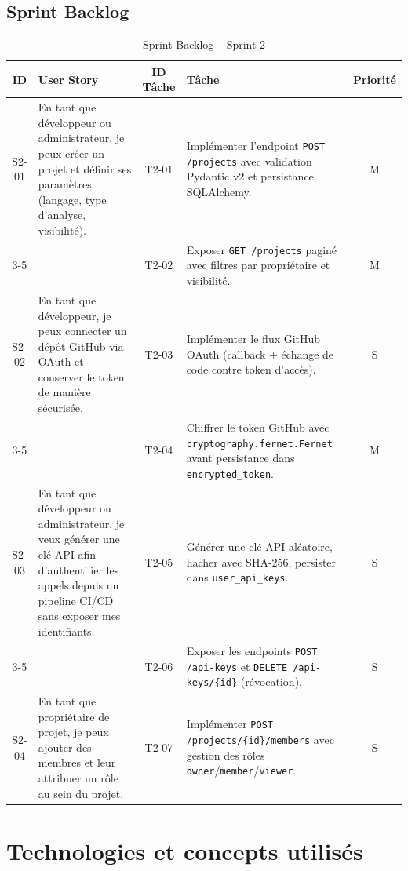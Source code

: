 \subsection{Sprint Backlog}
\begin{table}[H]
\centering
\caption{Sprint Backlog -- Sprint 2}
\label{tab:sprint2-backlog}
\small
\renewcommand{\arraystretch}{1.3}
\begin{tabularx}{\textwidth}{c X c X c}
\hline
\rowcolor{gray!15}
\textbf{ID} & \textbf{User Story} & \textbf{ID Tâche} & \textbf{Tâche} & \textbf{Priorité} \\
\hline
S2-01 & En tant que développeur ou administrateur, je peux créer un projet et définir ses paramètres (langage, type d'analyse, visibilité).
  & T2-01 & Implémenter l'endpoint \texttt{POST /projects} avec validation Pydantic v2 et persistance SQLAlchemy. & M \\
\cline{3-5}
  & & T2-02 & Exposer \texttt{GET /projects} paginé avec filtres par propriétaire et visibilité. & M \\
\hline
S2-02 & En tant que développeur, je peux connecter un dépôt GitHub via OAuth et conserver le token de manière sécurisée.
  & T2-03 & Implémenter le flux GitHub OAuth (callback + échange de code contre token d'accès). & S \\
\cline{3-5}
  & & T2-04 & Chiffrer le token GitHub avec \texttt{cryptography.fernet.Fernet} avant persistance dans \texttt{encrypted\_token}. & M \\
\hline
S2-03 & En tant que développeur ou administrateur, je veux générer une clé API afin d'authentifier les appels depuis un pipeline CI/CD sans exposer mes identifiants.
  & T2-05 & Générer une clé API aléatoire, hacher avec SHA-256, persister dans \texttt{user\_api\_keys}. & S \\
\cline{3-5}
  & & T2-06 & Exposer les endpoints \texttt{POST /api-keys} et \texttt{DELETE /api-keys/\{id\}} (révocation). & S \\
\hline
S2-04 & En tant que propriétaire de projet, je peux ajouter des membres et leur attribuer un rôle au sein du projet.
  & T2-07 & Implémenter \texttt{POST /projects/\{id\}/members} avec gestion des rôles \texttt{owner}/\texttt{member}/\texttt{viewer}. & S \\
\hline
\end{tabularx}
\end{table}

\section{Technologies et concepts utilisés}

